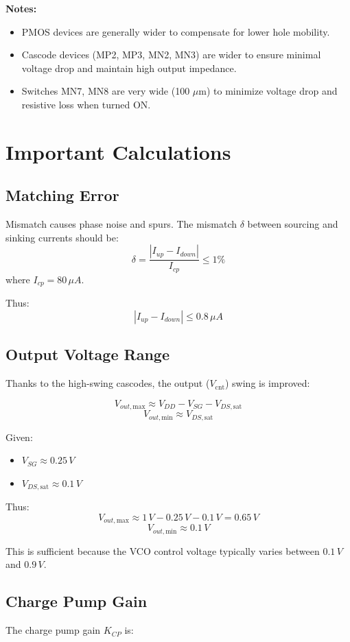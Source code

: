 \begin{itemize}
\textbf{Notes:}
\begin{itemize}
    \item PMOS devices are generally wider to compensate for lower hole mobility.
    \item Cascode devices (MP2, MP3, MN2, MN3) are wider to ensure minimal voltage drop and maintain high output impedance.
    \item Switches MN7, MN8 are very wide (100 $\mu$m) to minimize voltage drop and resistive loss when turned ON.
\end{itemize}

\section{Important Calculations}

\subsection{Matching Error}
Mismatch causes phase noise and spurs. The mismatch $\delta$ between sourcing and sinking currents should be:
\[
\delta = \frac{|I_{up} - I_{down}|}{I_{cp}} \leq 1\%
\]
where $I_{cp} = 80\,\mu A$.

Thus:
\[
|I_{up} - I_{down}| \leq 0.8\,\mu A
\]

\subsection{Output Voltage Range}
Thanks to the high-swing cascodes, the output ($V_{\text{cnt}}$) swing is improved:

\[
V_{out,\text{max}} \approx V_{DD} - V_{SG} - V_{DS,\text{sat}}
\]
\[
V_{out,\text{min}} \approx V_{DS,\text{sat}}
\]

Given:
\begin{itemize}
    \item $V_{SG} \approx 0.25\,V$
    \item $V_{DS,\text{sat}} \approx 0.1\,V$
\end{itemize}

Thus:
\[
V_{out,\text{max}} \approx 1\,V - 0.25\,V - 0.1\,V = 0.65\,V
\]
\[
V_{out,\text{min}} \approx 0.1\,V
\]

This is sufficient because the VCO control voltage typically varies between $0.1\,V$ and $0.9\,V$.

\subsection{Charge Pump Gain}
The charge pump gain $K_{CP}$ is:


\end{itemize}
